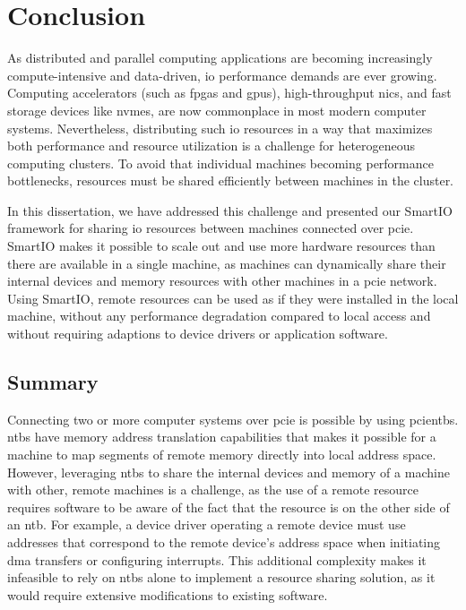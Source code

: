 \chapter{Conclusion}\label{chapter:conclusion}
As distributed and parallel computing applications are becoming increasingly compute-intensive and data-driven, \gls{io} performance demands are ever growing.
%
Computing accelerators (such as \glspl{fpga} and \glspl{gpu}), high-throughput \glspl{nic}, and fast storage devices like \glspl{nvme}, are now commonplace in most modern computer systems.
%
Nevertheless, distributing such \gls{io} resources in a way that maximizes both performance and resource utilization is a challenge for heterogeneous computing clusters. 
%
To avoid that individual machines becoming performance bottlenecks, resources must be shared efficiently between machines in the cluster.



In this dissertation, we have addressed this challenge and presented our SmartIO framework for sharing \gls{io} resources between machines connected over \gls{pcie}.
%
SmartIO makes it possible to scale out and use more hardware resources than there are available in a single machine, as machines can dynamically share their internal devices and memory resources with other machines in a \gls{pcie} network. 
%
Using SmartIO, remote resources can be used as if they were installed in the local machine, without any performance degradation compared to local access and without requiring adaptions to device drivers or application software.




\section{Summary}\label{sec:summary}
Connecting two or more computer systems over \gls{pcie} is possible by using \glspl{pcientb}.
%
\Glspl{ntb} have memory address translation capabilities that makes it possible for a machine to map \glspl{segment} of remote memory directly into local address space.
%
However, leveraging \glspl{ntb} to share the internal devices and memory of a machine with other, remote machines is a challenge, as the use of a remote resource requires software to be aware of the fact that the resource is on the other side of an \gls{ntb}.
%
For example, a device driver operating a remote device must use addresses that correspond to the remote device's address space when initiating \gls{dma} transfers or configuring interrupts.
%
This additional complexity makes it infeasible to rely on \glspl{ntb} alone to implement a resource sharing solution, as it would require extensive modifications to existing software.



